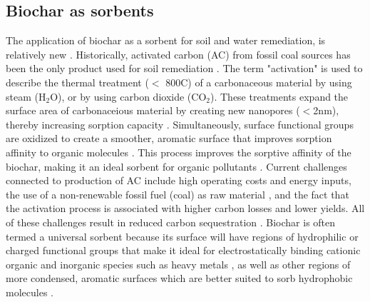 \subsection{Biochar as sorbents}
The application of biochar as a sorbent for soil and water remediation, is relatively new \citep{beesley2011review}. Historically, activated carbon (\acrshort{AC}) from fossil coal sources has been the only product used for soil remediation \citep{hagemann2018activated}. The term "activation" is used to describe the thermal treatment ($<$ 800\textdegree C) of a carbonaceous material by using steam ($\mathrm{H_2O}$), or by using carbon dioxide ($\mathrm{CO_2}$). These treatments expand the surface area of carbonaceious material by creating new nanopores ($<$2nm), thereby increasing sorption capacity \citep{LehmannAndJoseph2015}. Simultaneously, surface functional groups are oxidized to create a smoother, aromatic surface that improves sorption affinity to organic molecules \citep{sajjadi2019comprehensive}. This process improves the sorptive affinity of the biochar, making it an ideal sorbent for organic pollutants \citep{Ahmad2014}. Current challenges connected to production of AC include high operating costs and energy inputs, the use of a non-renewable fossil fuel (coal) as raw material \citep{Li2019}, and the fact that the activation process is associated with higher carbon losses and lower yields. All of these challenges result in reduced carbon sequestration \citep{Sormo2021}. Biochar is often termed a universal sorbent because its surface will have regions of hydrophilic or charged functional groups that make it ideal for electrostatically binding cationic organic and inorganic species such as heavy metals \citep{silvani2019can,zhang2013sorption}, as well as other regions of more condensed, aromatic surfaces which are better suited to sorb hydrophobic molecules \citep{Cornelissen2005}.

